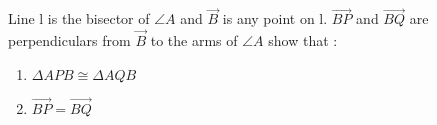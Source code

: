 Line l is the bisector of $\angle{A}$ and $\vec{B}$ is any point on l. $\vec{BP}$ and $\vec{BQ}$ are perpendiculars from $\vec{B}$ to the arms of $\angle{A}$
 show that :
\begin{enumerate}[label = (\alph*)]
\item$\Delta APB \cong \Delta AQB$ 
\item $\vec{BP} = \vec{BQ}$
\end{enumerate}
